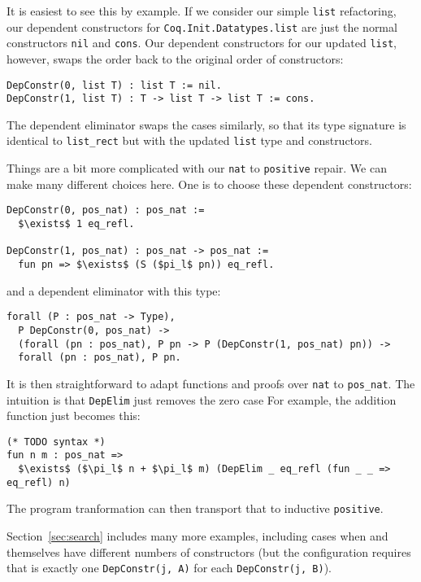 It is easiest to see this by example.
If we consider our simple \lstinline{list} refactoring, our dependent
constructors for \lstinline{Coq.Init.Datatypes.list} are just the normal constructors
\lstinline{nil} and \lstinline{cons}. Our dependent constructors for our updated
\lstinline{list}, however, swaps the order back to the original order of constructors:

\begin{lstlisting}
DepConstr(0, list T) : list T := nil.
DepConstr(1, list T) : T -> list T -> list T := cons.
\end{lstlisting}
The dependent eliminator swaps the cases similarly, so that its type signature is identical
to \lstinline{list_rect} but with the updated \lstinline{list} type and constructors.

Things are a bit more complicated with our \lstinline{nat} to \lstinline{positive} repair.
We can make many different choices here. One is to choose these dependent constructors:

\begin{lstlisting}
DepConstr(0, pos_nat) : pos_nat :=
  $\exists$ 1 eq_refl.

DepConstr(1, pos_nat) : pos_nat -> pos_nat :=
  fun pn => $\exists$ (S ($pi_l$ pn)) eq_refl.
\end{lstlisting} %
and a dependent eliminator with this type:

\begin{lstlisting}
forall (P : pos_nat -> Type),
  P DepConstr(0, pos_nat) ->
  (forall (pn : pos_nat), P pn -> P (DepConstr(1, pos_nat) pn)) ->
  forall (pn : pos_nat), P pn.
\end{lstlisting}
It is then straightforward to adapt functions and proofs over \lstinline{nat} to \lstinline{pos_nat}.
The intuition is that \lstinline{DepElim} just removes the zero case 
For example, the addition function just becomes this:

\begin{lstlisting}
(* TODO syntax *)
fun n m : pos_nat =>
  $\exists$ ($\pi_l$ n + $\pi_l$ m) (DepElim _ eq_refl (fun _ _ => eq_refl) n)
\end{lstlisting} %
The program tranformation can then transport that to inductive \lstinline{positive}.

Section~\ref{sec:search} includes many more examples, including cases when \A and \B
themselves have different numbers of constructors (but the configuration requires that
is exactly one \lstinline{DepConstr(j, A)} for each \lstinline{DepConstr(j, B)}).

